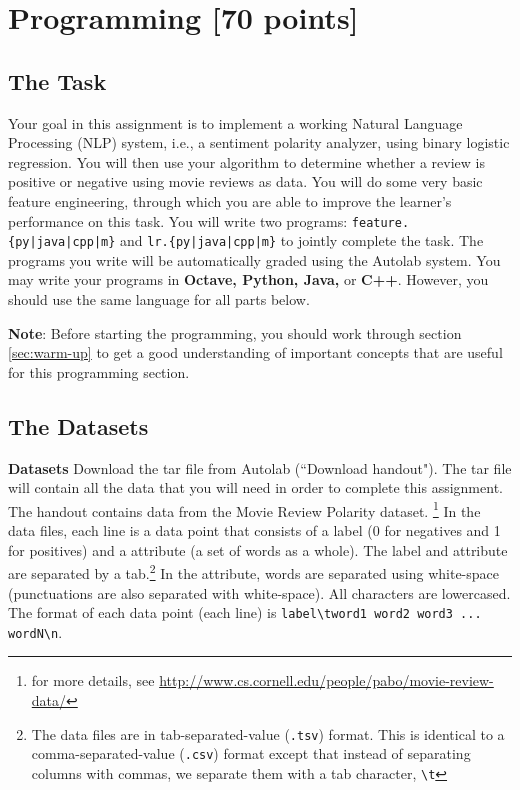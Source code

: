 \documentclass[11pt]{article}
\numberwithin{equation}{section} %
\numberwithin{figure}{section} %
\numberwithin{table}{section} %
\begin{document}
\begin{enumerate}
        
\end{enumerate}

\newpage

\section{Programming [70 points]}
\label{programming}

\subsection{The Task}\label{task}

Your goal in this assignment is to implement a working Natural Language Processing (NLP) system, i.e., a sentiment polarity analyzer, using binary logistic regression. You will then use your algorithm to determine whether a review is positive or negative using movie reviews as data. You will do some very basic feature engineering, through which you are able to improve the learner's performance on this task. You will write two programs: \texttt{feature.\{py|java|cpp|m\}} and \texttt{lr.\{py|java|cpp|m\}} to jointly complete the task. The programs you write will be automatically graded using the Autolab system. You may write your programs in {\bf Octave, Python, Java,} or {\bf C++}. However, you should use the same language for all parts below.

\textbf{Note}: Before starting the programming, you should work through section \ref{sec:warm-up} to get a good understanding of important concepts that are useful for this programming section. 

\subsection{The Datasets}\label{dataset}


  {\bf Datasets } Download the tar file from Autolab (``Download handout"). The tar file will contain all the data that you will need in order to complete this assignment. The handout contains data from the Movie Review Polarity dataset. \footnote{for more details, see \url{http://www.cs.cornell.edu/people/pabo/movie-review-data/}} In the data files, each line is a data point that consists of a label (0 for negatives and 1 for positives) and a attribute (a set of words as a whole). The label and attribute are separated by a tab.\footnote{The data files are in tab-separated-value (\lstinline{.tsv}) format. This is identical to a comma-separated-value (\lstinline{.csv}) format except that instead of separating columns with commas, we separate them with a tab character, \lstinline{\t}} In the attribute, words are separated using white-space (punctuations are also separated with white-space). All characters are lowercased. The format of each data point (each line) is \lstinline{label\tword1 word2 word3 ... wordN\n}.
\end{document}
